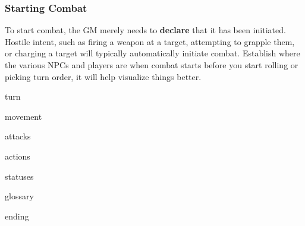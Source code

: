 \subsubsection{Starting Combat}

To start combat, the GM merely needs to \textbf{declare} that it has been initiated. Hostile intent, such as firing a weapon at a target, attempting to grapple them, or charging a target will typically automatically initiate combat. Establish where the various NPCs and players are when combat starts before you start rolling or picking turn order, it will help visualize things better.

{turn}

{movement}

{attacks}

{actions}

{statuses}

{glossary}

{ending}
